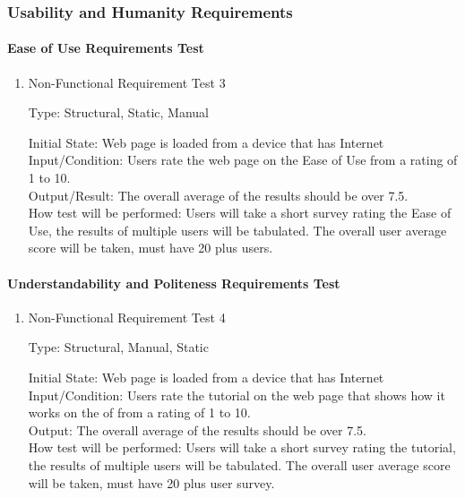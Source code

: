 \documentclass[12pt, titlepage]{article}
\begin{document}
\subsubsection{Usability and Humanity Requirements}

\paragraph{Ease of Use Requirements Test}

\begin{enumerate}

\item{ Non-Functional Requirement Test 3\\}

Type: Structural, Static, Manual
					
Initial State: Web page is loaded from a device that has Internet \\
					
Input/Condition: Users rate the web page on the Ease of Use from a rating of 1 to 10. \\
					
Output/Result: The overall average of the results should be over 7.5. \\
					
How test will be performed: Users will take a short survey rating the Ease of Use, the results of multiple users will be
tabulated. The overall user average score will be taken, must have 20 plus users. \\

\end{enumerate}

\paragraph{Understandability and Politeness Requirements Test}

\begin{enumerate}

\item{Non-Functional Requirement Test 4\\}

Type: Structural, Manual, Static
					
Initial State: Web page is loaded from a device that has Internet \\
					
Input/Condition: Users rate the tutorial on the web page that shows how it works on the  of from a rating of 1 to 10. \\
					
Output: The overall average of the results should be over 7.5. \\
					
How test will be performed: Users will take a short survey rating the tutorial, the results of multiple users will be
tabulated. The overall user average score will be taken, must have 20 plus user survey. \\
\end{enumerate}
\end{document}
